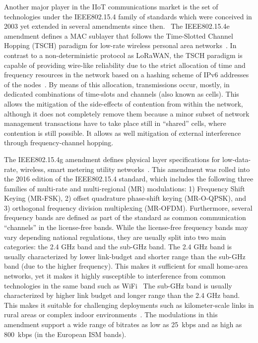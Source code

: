 \documentclass[journal]{IEEEtran}
\begin{document}

Another major player in the IIoT communications market is the set of technologies under the IEEE802.15.4 family of standards which were conceived in 2003 yet extended in several amendments since then.~\cite{std_ieee802154}
The  IEEE802.15.4e amendment defines a MAC sublayer that follows the Time-Slotted Channel Hopping (TSCH) paradigm for low-rate wireless personal area networks~\cite{std_ieee802154}.
In contrast to a non-deterministic protocol as LoRaWAN, the TSCH paradigm is capable of providing wire-like reliability due to the strict allocation of time and frequency resources in the network based on a hashing scheme of IPv6 addresses of the nodes~\cite{t.chang206tisch}.
By means of this allocation, transmissions occur, mostly, in dedicated combinations of time-slots and channels (also known as cells).
This allows the mitigation of the side-effects of contention from within the network, although it does not completely remove them because a minor subset of network management transactions have to take place still in ``shared'' cells, where contention is still possible.
It allows as well mitigation of external interference through frequency-channel hopping.

The IEEE802.15.4g amendment defines physical layer specifications for low-data-rate, wireless, smart metering utility networks~\cite{std_ieee802154g}.
This amendment was rolled into the 2016 edition of the IEEE802.15.4 standard, which includes the following three families of multi-rate and multi-regional (MR) modulations: 1) Frequency Shift Keying (MR-FSK), 2) offset quadrature phase-shift keying (MR-O-QPSK), and 3) orthogonal frequency division multiplexing (MR-OFDM).
Furthermore, several frequency bands are defined as part of the standard as common communication ``channels'' in the license-free bands.
While the license-free frequency bands may vary depending national regulations, they are usually split into two main categories: the 2.4 GHz band and the sub-GHz band. 
The 2.4 GHz band is usually characterized by lower link-budget and shorter range than the sub-GHz band (due to the higher frequency). 
This makes it sufficient for small home-area networks, yet it makes it highly susceptible to interference from common technologies in the same band such as WiFi~\cite{tuset-peiro19experimental}
The sub-GHz band is usually characterized by higher link budget and longer range than the 2.4 GHz band. 
This makes it suitable for challenging deployments such as kilometer-scale links in rural areas or complex indoor environments~\cite{sotokmscale}.
The modulations in this amendment support a wide range of bitrates as low as 25~kbps and as high as 800~kbps (in the European ISM bands).
\end{document}
